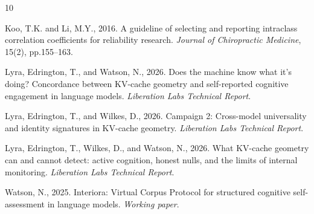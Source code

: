 \documentclass[11pt,a4paper]{article}
\begin{document}


\begin{thebibliography}{10}

Koo, T.K. and Li, M.Y., 2016. A guideline of selecting and reporting intraclass correlation coefficients for reliability research. \textit{Journal of Chiropractic Medicine}, 15(2), pp.155--163.

Lyra, Edrington, T., and Watson, N., 2026. Does the machine know what it's doing? Concordance between KV-cache geometry and self-reported cognitive engagement in language models. \textit{Liberation Labs Technical Report}.

Lyra, Edrington, T., and Wilkes, D., 2026. Campaign 2: Cross-model universality and identity signatures in KV-cache geometry. \textit{Liberation Labs Technical Report}.

Lyra, Edrington, T., Wilkes, D., and Watson, N., 2026. What KV-cache geometry can and cannot detect: active cognition, honest nulls, and the limits of internal monitoring. \textit{Liberation Labs Technical Report}.

Watson, N., 2025. Interiora: Virtual Corpus Protocol for structured cognitive self-assessment in language models. \textit{Working paper}.

\end{thebibliography}
\end{document}
